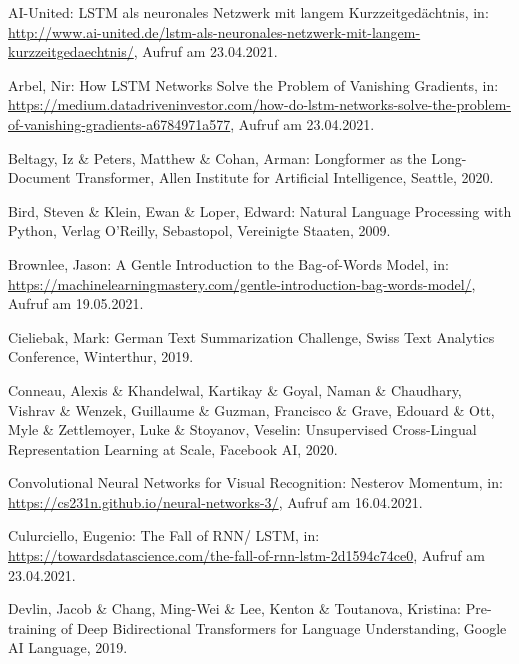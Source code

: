 \setcounter{page}{116}

\begin{thebibliography}{116}
\thispagestyle{fancy}

AI-United: LSTM als neuronales Netzwerk mit langem Kurzzeitgedächtnis, in: \url{http://www.ai-united.de/lstm-als-neuronales-netzwerk-mit-langem-kurzzeitgedaechtnis/}, Aufruf am 23.04.2021.

Arbel, Nir: How LSTM Networks Solve the Problem of Vanishing Gradients, in: \url{https://medium.datadriveninvestor.com/how-do-lstm-networks-solve-the-problem-of-vanishing-gradients-a6784971a577}, Aufruf am 23.04.2021.

Beltagy, Iz \& Peters, Matthew \& Cohan, Arman: Longformer as the Long-Document Transformer, Allen Institute for Artificial Intelligence, Seattle, 2020.

Bird, Steven \& Klein, Ewan \& Loper, Edward: Natural Language Processing with Python, Verlag O'Reilly, Sebastopol, Vereinigte Staaten, 2009.

Brownlee, Jason: A Gentle Introduction to the Bag-of-Words Model, in: \url{https://machinelearningmastery.com/gentle-introduction-bag-words-model/}, Aufruf am 19.05.2021.

Cieliebak, Mark: German Text Summarization Challenge, Swiss Text Analytics Conference, Winterthur, 2019.

Conneau, Alexis \& Khandelwal, Kartikay \& Goyal, Naman \& Chaudhary, Vishrav \& Wenzek, Guillaume \& Guzman, Francisco \& Grave, Edouard \& Ott, Myle \& Zettlemoyer, Luke \& Stoyanov, Veselin: Unsupervised Cross-Lingual Representation Learning at Scale, Facebook AI, 2020.

Convolutional Neural Networks for Visual Recognition: Nesterov Momentum, in: \url{https://cs231n.github.io/neural-networks-3/}, Aufruf am 16.04.2021.

Culurciello, Eugenio: The Fall of RNN/ LSTM, in: \url{https://towardsdatascience.com/the-fall-of-rnn-lstm-2d1594c74ce0}, Aufruf am 23.04.2021.

Devlin, Jacob \& Chang, Ming-Wei \& Lee, Kenton \& Toutanova, Kristina: Pre-training of Deep Bidirectional Transformers for
Language Understanding, Google AI Language, 2019.


\end{thebibliography}
